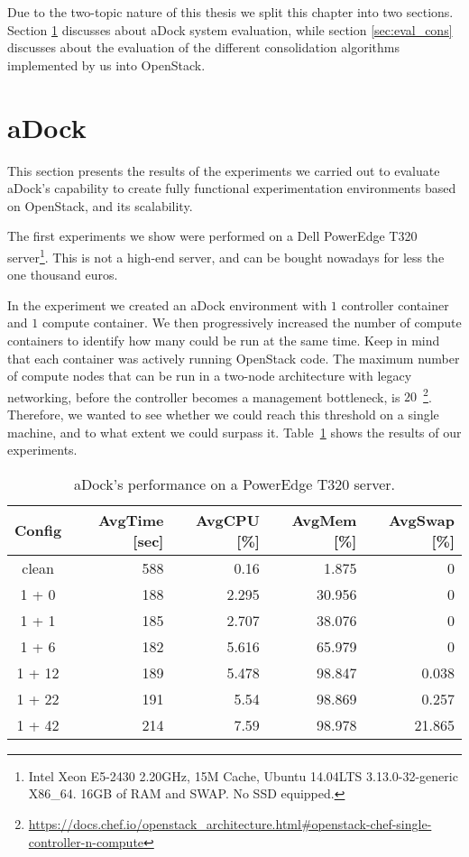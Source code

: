 
Due to the two-topic nature of this thesis we split this chapter into two sections. Section \ref{sec:eval_adock} discusses about aDock system evaluation, while section \ref{sec:eval_cons} discusses about the evaluation of the different consolidation algorithms implemented by us into OpenStack.

\section{aDock}
\label{sec:eval_adock}
This section presents the results of the experiments we carried out to evaluate aDock's capability to create fully functional experimentation environments based on OpenStack, and its scalability.

The first experiments we show were performed on a Dell PowerEdge T320 server\footnote{Intel Xeon E5-2430 2.20GHz, 15M Cache, Ubuntu 14.04LTS 3.13.0-32-generic X86\_64. 16GB of RAM and SWAP. No SSD equipped.}. This is not a high-end server, and can be bought nowadays for less the one thousand euros. 

In the experiment we created an aDock environment with $1$ controller container and $1$ compute container. We then progressively increased the number of compute containers to identify how many could be run at the same time. Keep in mind that each container was actively running OpenStack code. The maximum number of compute nodes that can be run in a two-node architecture with legacy networking, before the controller becomes a management bottleneck, is $20$~\footnote{\url{https://docs.chef.io/openstack_architecture.html#openstack-chef-single-controller-n-compute}}. Therefore, we wanted to see whether we could reach this threshold on a single machine, and to what extent we could surpass it. Table~\ref{tab:adock_server} shows the results of our experiments.

\begin{table}[h!]
\centering
  \begin{tabular}{| c | r | r | r | r |}
  \hline
  \textbf{Config} & \textbf{AvgTime [sec]} & \textbf{AvgCPU [\%]} & \textbf{AvgMem [\%]} & \textbf{AvgSwap [\%]}  \\
  \hline
  clean & 588 & 0.16 & 1.875 & 0 \\
  \hline
  1 + 0 & 188 & 2.295 & 30.956 & 0 \\
  \hline
  1 + 1 & 185 & 2.707 & 38.076 & 0 \\
  \hline
  1 + 6 & 182 & 5.616 & 65.979 & 0 \\
  \hline
  1 + 12 & 189 & 5.478 & 98.847 & 0.038 \\
  \hline
  1 + 22 & 191 & 5.54 & 98.869 & 0.257 \\
  \hline
  1 + 42 & 214 & 7.59 & 98.978 & 21.865 \\
  \hline
  \end{tabular}
  \vspace{2mm}
  \caption{aDock's performance on a PowerEdge T320 server.}
  \label{tab:adock_server}
\end{table}

